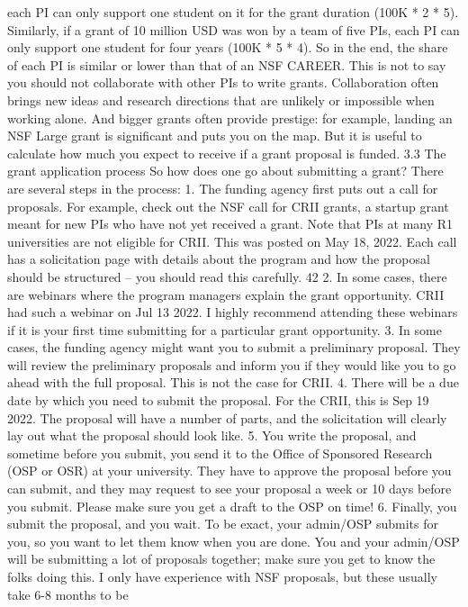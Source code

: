 \documentclass[oneside,11pt]{memoir}
\begin{document}
each PI can only support one student on it for the grant duration (100K * 2 * 5). Similarly, if a
grant of 10 million USD was won by a team of five PIs, each PI can only support one student for
four years (100K * 5 * 4). So in the end, the share of each PI is similar or lower than that of an
NSF CAREER.
This is not to say you should not collaborate with other PIs to write grants. Collaboration often
brings new ideas and research directions that are unlikely or impossible when working alone.
And bigger grants often provide prestige: for example, landing an NSF Large grant is significant
and puts you on the map. But it is useful to calculate how much you expect to receive if a grant
proposal is funded.
3.3 The grant application process
So how does one go about submitting a grant? There are several steps in the process:
1. The funding agency first puts out a call for proposals. For example, check out the NSF
call for CRII grants, a startup grant meant for new PIs who have not yet received a grant.
Note that PIs at many R1 universities are not eligible for CRII. This was posted on May 18,
2022. Each call has a solicitation page with details about the program and how the
proposal should be structured – you should read this carefully.
42
2. In some cases, there are webinars where the program managers explain the grant
opportunity. CRII had such a webinar on Jul 13 2022. I highly recommend attending
these webinars if it is your first time submitting for a particular grant opportunity.
3. In some cases, the funding agency might want you to submit a preliminary proposal.
They will review the preliminary proposals and inform you if they would like you to go
ahead with the full proposal. This is not the case for CRII.
4. There will be a due date by which you need to submit the proposal. For the CRII, this is
Sep 19 2022. The proposal will have a number of parts, and the solicitation will clearly lay
out what the proposal should look like.
5. You write the proposal, and sometime before you submit, you send it to the Office of
Sponsored Research (OSP or OSR) at your university. They have to approve the proposal
before you can submit, and they may request to see your proposal a week or 10 days
before you submit. Please make sure you get a draft to the OSP on time!
6. Finally, you submit the proposal, and you wait. To be exact, your admin/OSP submits for
you, so you want to let them know when you are done. You and your admin/OSP will be
submitting a lot of proposals together; make sure you get to know the folks doing this. I
only have experience with NSF proposals, but these usually take 6-8 months to be
\end{document}
